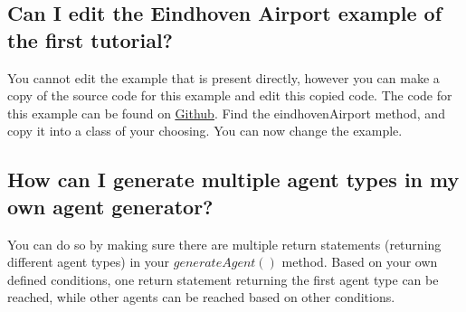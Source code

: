\documentclass{article}
\begin{document}
\subsection*{Can I edit the Eindhoven Airport example of the first tutorial?}
You cannot edit the example that is present directly, however you can make a copy of the source code for this example and edit this copied code. The code for this example can be found on \href{https://github.com/StefJanssen/AATOM/blob/master/Simulator/src/simulation/simulationBuilder/SimulationBuilder.java}{\underline{Github}}. Find the eindhovenAirport method, and copy it into a class of your choosing. You can now change the example.

\subsection*{How can I generate multiple agent types in my own agent generator?}
You can do so by making sure there are multiple return statements (returning different agent types) in your $generateAgent()$ method. Based on your own defined conditions, one return statement returning the first agent type can be reached, while other agents can be reached based on other conditions.
\end{document}
